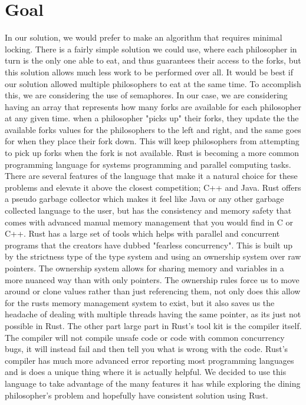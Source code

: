 \documentclass[conference]{IEEEtran}
\begin{document}
	\section{Goal}
	In our solution, we would prefer to make an algorithm that requires minimal locking. There is a fairly simple solution we could use, where each philosopher in turn is the only one able to eat, and thus guarantees their access to the forks, but this solution allows much less work to be performed over all. It would be best if our solution allowed multiple philosophers to eat at the same time. To accomplish this, we are considering the use of semaphores. In our case, we are considering having an array that represents how many forks are available for each philosopher at any given time. when a philosopher "picks up" their forks, they update the the available forks values for the philosophers to the left and right, and the same goes for when they place their fork down. This will keep philosophers from attempting to pick up forks when the fork is not available. 
	\linebreak
	\linebreak
	Rust is becoming a more common programming language for systems programming and parallel computing tasks. There are several features of the language that make it a natural choice for these problems and elevate it above the closest competition; C++ and Java. Rust offers a pseudo garbage collector which makes it feel like Java or any other garbage collected language to the user, but has the consistency and memory safety that comes with advanced manual memory management that you would find in C or C++. Rust has a large set of tools which helps with parallel and concurrent programs that the creators have dubbed "fearless concurrency". This is built up by the strictness type of the type system and using an ownership system over raw pointers. The ownership system allows for sharing memory and variables in a more nuanced way than with only pointers. The ownership rules force us to move around or clone values rather than just referencing them, not only does this allow for the rusts memory management system to exist, but it also saves us the headache of dealing with multiple threads having the same pointer, as its just not possible in Rust. The other part large part in Rust's tool kit is the compiler itself. The compiler will not compile unsafe code or code with common concurrency bugs, it will instead fail and then tell you what is wrong with the code. Rust's compiler has much more advanced error reporting most programming languages and is does a unique thing where it is actually helpful. We decided to use this language to take advantage of the many features it has while exploring the dining philosopher's problem and hopefully have consistent solution using Rust.
	\pagebreak

	
\end{document}
